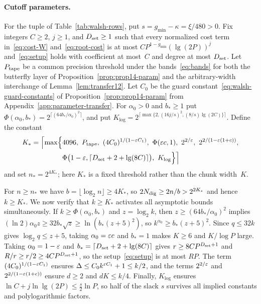 \paragraph{Cutoff parameters.}
For the tuple of Table~\ref{tab:walsh-rows}, put $s=g_{\min}-\kappa=\xi/480>0$. Fix integers $C\ge2$, $j\ge1$, and
$D_{\rm set}\ge1$ such that every normalized cost term in~\eqref{eq:cost-W} and~\eqref{eq:root-cost} is at most
$CP^{1-g_{\min}}(\lg(2P))^j$ and~\eqref{eq:setup} holds with coefficient at most~$C$ and degree at most $D_{\rm set}$.
Let $P_{\rm tape}$ be a common precision threshold under the bands~\eqref{eq:bands} for both the butterfly layer of
Proposition~\ref{prop:prop14-param} and the arbitrary-width interchange of Lemma~\ref{lem:transfer12}. Let $C_0$ be the
guard constant~\eqref{eq:walsh-guard-constants} of Proposition~\ref{prop:prop14-param} from
Appendix~\ref{app:parameter-transfer}. For $\alpha_0>0$ and $b_*\ge1$ put
$\Phi(\alpha_0,b_*)=2^{\lceil(64b_*/\alpha_0)^2\rceil}$, and put
$K_{\log}=2^{\lceil\max\{2,(16j/s)^2,(8/s)\lg(2C)\}\rceil}$. Define the constant
\begin{equation}\label{eq:cutoff}
\begin{aligned}
  K_*=\Bigl\lceil\max\Bigl\{&4096,\ P_{\rm tape},\ (4C_0)^{1/(1-\eps C_1)},\ \Phi(\eps c,1),\ 2^{2/\eps},\
  2^{2/(1-\eps(1+c))},\\
  &\Phi\bigl(1-\eps,\lceil D_{\rm set}+2+\lg(8C)\rceil\bigr),\ K_{\log}\Bigr\}\Bigr\rceil
\end{aligned}
\end{equation}
and set $n_*=2^{4K_*}$; here $K_*$ is a fixed threshold rather than the chunk width~$K$.

For $n\ge n_*$ we have $b=\lfloor\log_2n\rfloor\ge4K_*$, so $2N_{\rm dig}\ge2n/b>2^{2K_*}$ and hence $k\ge K_*$. We now
verify that $k\ge K_*$ activates all asymptotic bounds simultaneously. If $k\ge\Phi(\alpha_0,b_*)$ and $z=\log_2k$, then
$z\ge(64b_*/\alpha_0)^2$ implies $(\ln2)\alpha_0z\ge32b_*\sqrt z\ge\ln(b_*(z+5)^2)$, so $k^{\alpha_0}\ge b_*(z+5)^2$.
Since $q\le32k$ gives $\log_2q\le z+5$, taking $\alpha_0=\varepsilon c$ and $b_*=1$ makes $K\ge6$ and $K/\log P$ large. Taking
$\alpha_0=1-\varepsilon$ and $b_*=\lceil D_{\rm set}+2+\lg(8C)\rceil$ gives $r\ge8CP^{D_{\rm set}+1}$ and
$R/r\ge r/2\ge4CP^{D_{\rm set}+1}$, so the setup~\eqref{eq:setup} is at most $RP$. The term $(4C_0)^{1/(1-\varepsilon C_1)}$
ensures $\Delta\le C_0k^{\varepsilon C_1}+1\le k/2$, and the terms $2^{2/\varepsilon}$ and $2^{2/(1-\varepsilon(1+c))}$ ensure $d\ge2$ and
$dK\le k/4$. Finally, $K_{\log}$ ensures $\ln C+j\ln\lg(2P)\le\frac s2\ln P$, so half of the slack $s$ survives all
implied constants and polylogarithmic factors.

